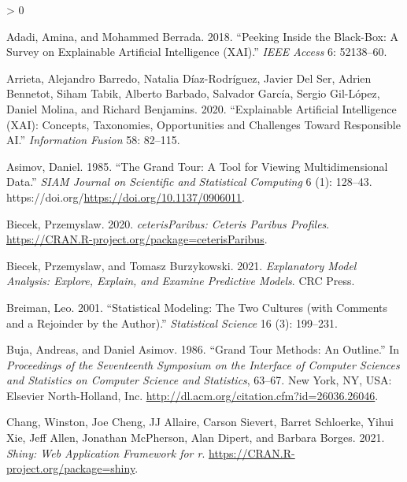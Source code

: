 \documentclass[
]{article}
\newlength{\cslhangindent}
\newenvironment{CSLReferences}[2] %
 {%
  \setlength{\parindent}{0pt}
  \ifodd #1 \everypar{\setlength{\hangindent}{\cslhangindent}}\ignorespaces\fi
  \ifnum #2 > 0
  \setlength{\parskip}{#2\baselineskip}
  \fi
 }%
 {}
\begin{document}
\hypertarget{refs}{}
\begin{CSLReferences}{1}{0}
\leavevmode\hypertarget{ref-adadi_peeking_2018}{}%
Adadi, Amina, and Mohammed Berrada. 2018. {``Peeking Inside the Black-Box: A Survey on Explainable Artificial Intelligence ({XAI}).''} \emph{IEEE Access} 6: 52138--60.

\leavevmode\hypertarget{ref-arrieta_explainable_2020}{}%
Arrieta, Alejandro Barredo, Natalia Díaz-Rodríguez, Javier Del Ser, Adrien Bennetot, Siham Tabik, Alberto Barbado, Salvador García, Sergio Gil-López, Daniel Molina, and Richard Benjamins. 2020. {``Explainable {Artificial} {Intelligence} ({XAI}): {Concepts}, Taxonomies, Opportunities and Challenges Toward Responsible {AI}.''} \emph{Information Fusion} 58: 82--115.

\leavevmode\hypertarget{ref-asimov_grand_1985}{}%
Asimov, Daniel. 1985. {``The {Grand} {Tour}: A {Tool} for {Viewing} {Multidimensional} {Data}.''} \emph{SIAM Journal on Scientific and Statistical Computing} 6 (1): 128--43. https://doi.org/\url{https://doi.org/10.1137/0906011}.

\leavevmode\hypertarget{ref-biecek_ceterisparibus_2020}{}%
Biecek, Przemyslaw. 2020. \emph{{ceterisParibus}: {Ceteris} {Paribus} {Profiles}}. \url{https://CRAN.R-project.org/package=ceterisParibus}.

\leavevmode\hypertarget{ref-biecek_explanatory_2021}{}%
Biecek, Przemyslaw, and Tomasz Burzykowski. 2021. \emph{Explanatory {Model} {Analysis}: {Explore}, {Explain}, and {Examine} {Predictive} {Models}}. CRC Press.

\leavevmode\hypertarget{ref-breiman_statistical_2001}{}%
Breiman, Leo. 2001. {``Statistical Modeling: {The} Two Cultures (with Comments and a Rejoinder by the Author).''} \emph{Statistical Science} 16 (3): 199--231.

\leavevmode\hypertarget{ref-buja_grand_1986}{}%
Buja, Andreas, and Daniel Asimov. 1986. {``Grand {Tour} {Methods}: {An} {Outline}.''} In \emph{Proceedings of the {Seventeenth} {Symposium} on the {Interface} of {Computer} {Sciences} and {Statistics} on {Computer} {Science} and {Statistics}}, 63--67. New York, NY, USA: Elsevier North-Holland, Inc. \url{http://dl.acm.org/citation.cfm?id=26036.26046}.

\leavevmode\hypertarget{ref-chang_shiny_2021}{}%
Chang, Winston, Joe Cheng, JJ Allaire, Carson Sievert, Barret Schloerke, Yihui Xie, Jeff Allen, Jonathan McPherson, Alan Dipert, and Barbara Borges. 2021. \emph{Shiny: Web Application Framework for r}. \url{https://CRAN.R-project.org/package=shiny}.


\end{CSLReferences}
\end{document}
